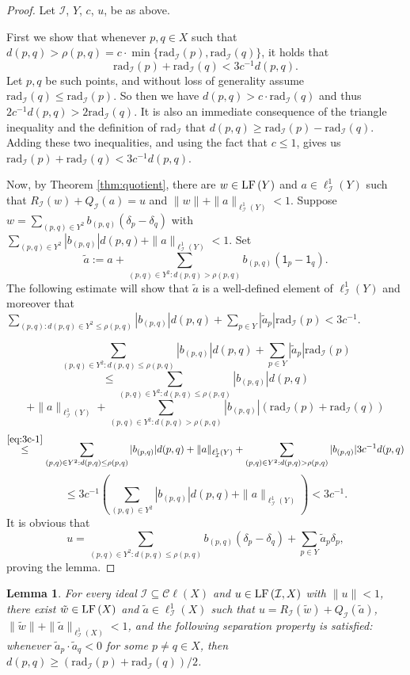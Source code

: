 \documentclass[12pt]{amsart}
\newtheorem{lemma}[theorem]{Lemma}
\theoremstyle{definition}
\numberwithin{equation}{section}
\def \I {\mathcal{I}}
\def \sbs {\subseteq}
\def \one {\mathsf{1}}
\newcommand{\Cl}[1]{\mathcal{C}\ell\left(#1\right)}
\renewcommand{\l}[2]{\ell^1_{#1}\left( #2 \right)}
\newcommand{\rad}[2]{\mathrm{rad}_{#1}\left(#2\right)}
\begin{document}
\begin{proof}
Let $\I$, $Y$, $c$, $u$, be as above.

First we show that whenever $p,q \in X$ such that $d(p,q) > \rho(p,q) = c\cdot \min\{\rad{\I}{p},\rad{\I}{q}\}$, it holds that
\begin{equation} \label{eq:3c-1}
\rad{\I}{p}+\rad{\I}{q} < 3c^{-1}d(p,q).
\end{equation}
Let $p,q$ be such points, and without loss of generality assume $\rad{\I}{q} \leq \rad{\I}{p}$. So then we have $d(p,q) > c \cdot \rad{\I}{q}$ and thus $2c^{-1}d(p,q)>2\rad{\I}{q}$. It is also an immediate consequence of the triangle inequality and the definition of rad${_\I}$ that $d(p,q) \geq \rad{\I}{p}-\rad{\I}{q}$. Adding these two inequalities, and using the fact that $c \leq 1$, gives us $\rad{\I}{p}+\rad{\I}{q} < 3c^{-1}d(p,q)$.

Now, by Theorem \ref{thm:quotient}, there are $w \in \LF{Y}$ and $a \in \l{\I}{Y}$ such that $R_\I(w) + Q_\I(a) = u$ and $\|w\|+\|a\|_{\l{\I}{Y}} < 1$. Suppose $w = \sum_{(p,q) \in Y^2} b_{(p,q)}(\delta_p-\delta_q)$ with $\sum_{(p,q) \in Y^2}|b_{(p,q)}|d(p,q) + \|a\|_{\l{\I}{Y}} < 1$. Set
$$\tilde{a} := a + \sum_{(p,q) \in Y^2: d(p,q) > \rho(p,q)} b_{(p,q)}(\one_p-\one_q).$$
The following estimate will show that $\tilde{a}$ is a well-defined element of $\l{\I}{Y}$ and moreover that $\sum_{(p,q): d(p,q) \in Y^2 \leq \rho(p,q)}|b_{(p,q)}|d(p,q) + \sum_{p \in Y} |\tilde{a}_{p}|\rad{\I}{p} < 3c^{-1}.$

$$\sum_{(p,q) \in Y^2: d(p,q) \leq \rho(p,q)}|b_{(p,q)}|d(p,q) + \sum_{p \in Y} |\tilde{a}_{p}|\rad{\I}{p}$$
$$\leq \sum_{(p,q) \in Y^2: d(p,q) \leq \rho(p,q)}|b_{(p,q)}|d(p,q)$$
$$+ \|a\|_{\l{\I}{Y}} + \sum_{(p,q) \in Y^2: d(p,q) > \rho(p,q)} |b_{(p,q)}|(\rad{\I}{p}+\rad{\I}{q})$$
$$\overset{\eqref{eq:3c-1}}{\leq} \sum_{(p,q) \in Y^2: d(p,q) \leq \rho(p,q)}|b_{(p,q)}|d(p,q) + \|a\|_{\l{\I}{Y}} + \sum_{(p,q) \in Y^2: d(p,q) > \rho(p,q)} |b_{(p,q)}|3c^{-1}d(p,q)$$
$$\leq 3c^{-1}\left(\sum_{(p,q) \in Y^2}|b_{(p,q)}|d(p,q) + \|a\|_{\l{\I}{Y}}\right) < 3c^{-1}.$$
It is obvious that
$$u = \sum_{(p,q) \in Y^2: d(p,q) \leq \rho(p,q)}b_{(p,q)}(\delta_p-\delta_q) + \sum_{p \in Y} \tilde{a}_{p} \delta_p,$$
proving the lemma.
\end{proof}

\begin{lemma} \label{lem:quotientseparated}
For every ideal $\I \sbs \Cl{X}$ and $u \in \LF{\I}{X}$ with $\|u\| < 1$, there exist $\tilde{w} \in \LF{X}$ and $\tilde{a} \in \l{\I}{X}$ such that $u = R_\I(\tilde{w}) + Q_\I(\tilde{a})$, $\|\tilde{w}\| + \|\tilde{a}\|_{\l{\I}{X}} < 1$, and the following separation property is satisfied: whenever $\tilde{a}_p \cdot \tilde{a}_q < 0$ for some $p \neq q \in X$, then $d(p,q) \geq (\rad{\I}{p}+\rad{\I}{q})/2$.
\end{lemma}
\end{document}
